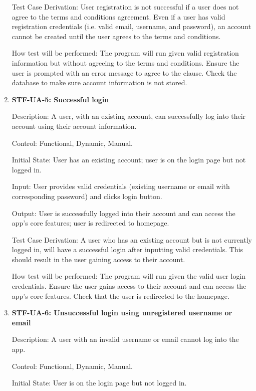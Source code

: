 \documentclass[12pt, titlepage]{article}
\begin{document}
\begin{enumerate}
        Test Case Derivation: User registration is not successful if a user does not agree to the terms and conditions agreement. Even if a user has valid registration credentials (i.e. valid email, username, and password), an account cannot be created until the user agrees to the terms and conditions.

        How test will be performed: The program will run given valid registration information but without agreeing to the terms and conditions. Ensure the user is prompted with an error message to agree to the clause. Check the database to make sure account information is not stored.

        \item{\textbf{STF-UA-5: Successful login}\\}

        Description: A user, with an existing account, can successfully log into their account using their account information.

        Control: Functional, Dynamic, Manual.

        Initial State: User has an existing account; user is on the login page but not logged in.

        Input: User provides valid credentials (existing username or email with corresponding password) and clicks login button.

        Output: User is successfully logged into their account and can access the app’s core features; user is redirected to homepage.

        Test Case Derivation: A user who has an existing account but is not currently logged in, will have a successful login after inputting valid credentials. This should result in the user gaining access to their account.

        How test will be performed: The program will run given the valid user login credentials. Ensure the user gains access to their account and can access the app’s core features. Check that the user is redirected to the homepage.

        \item{\textbf{STF-UA-6: Unsuccessful login using unregistered username or email}\\}

        Description: A user with an invalid username or email cannot log into the app.

        Control:  Functional, Dynamic, Manual.

        Initial State: User is on the login page but not logged in.


\end{enumerate}
\end{document}
